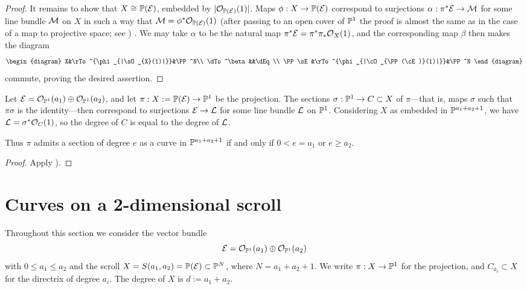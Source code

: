 \begin{proof}
It remains to show that $X \cong {\mathbb P}({\mathcal E})$, embedded by $|{\mathcal O}_{{\mathbb P}({\cal E})}(1)|$. Maps $\phi: X \to {\mathbb P} ({\mathcal E})$ correspond to surjections 
$\alpha: \pi^* {\mathcal E} \to {\mathcal M}$ for some line bundle ${\mathcal M}$ on $X$ in such a way that ${\mathcal M} = \phi^*{\mathcal O}_{{\mathbb P}({\mathcal E})}(1)$ (after passing to an open
cover of ${\mathbb P}^1$ the proof is almost the same as in the case of a map to projective space; see \cite[II.7.12]{Hartshorne1977}) . We may take $\alpha$ to be the 
natural map $\pi^*{\mathcal E} = \pi^*\pi_*{\mathcal O}_X(1)$, and the corresponding map $\beta$ then makes the diagram
$$
\begin{diagram}
 X&\rTo^{\phi_{|\sO_{X}(1)|}}&\PP^N\\
\dTo^\beta&&\dEq \\
\PP\sE &\rTo^{\phi_{|\cO_{\PP(\cE)}(1)|}}&\PP^N
\end{diagram}
$$
commute, proving the desired assertion.
\end{proof}
 
\begin{proposition}
Let ${\mathcal E} = {\mathcal O}_{{\mathbb P}^1}(a_1)\oplus {\mathcal O}_{{\mathbb P}^1}(a_2)$, and let $\pi: X:= {\mathbb P}({\mathcal E}) \to {\mathbb P}^1$ be the projection.
The sections $\sigma:{\mathbb P}^1 \to C\subset X$ of $\pi$---that is, maps $\sigma$ such that $\pi\sigma$ is the identity---then 
correspond to surjections
${\mathcal E} \to {\mathcal L}$ for some line bundle ${\mathcal L}$ on ${\mathbb P}^1$. Considering  $X$ as embedded in 
${\mathbb P}^{a_1+a_2+1}$, we have ${\mathcal L} = \sigma^*{\mathcal O}_C(1)$, so the degree of $C$ is equal
to the degree of ${\mathcal L}$.

Thus $\pi$ admits a section of degree $e$ as a curve in ${\mathbb P}^{a_1+a_2+1}$ if and only if
$0<e = a_1$ or $e\geq a_2$.
\end{proposition}

\begin{proof}
Apply \cite[II.7.12]{Hartshorne1977}).
\end{proof}

\section{Curves on a 2-dimensional scroll}\label{curves on scrolls}
 Throughout this section we consider the vector bundle 
$$
{\mathcal E} = {\mathcal O}_{{\mathbb P}^1}(a_1) \oplus{\mathcal O}_{{\mathbb P}^1}(a_2)
$$
with $0\leq a_1\leq a_2$ and the 
scroll $X = S(a_{1}, a_{2}) = {\mathbb P}({\mathcal E}) \subset {\mathbb P}^N$, where $N = a_1+a_2+1$. We write $\pi:X \to {\mathbb P}^1$ for the projection, and
$C_{a_i}\subset X$ for the directrix of degree $a_i$. The degree of $X$ is $d := a_1+a_2$.

